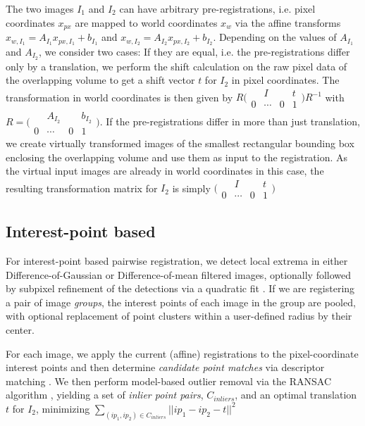 The two images $I_1$ and $I_2$ can have arbitrary pre-registrations, i.e. pixel coordinates $x_{px}$ are mapped to world coordinates $x_w$ via the affine transforms $x_{w,I_1} = A _{I_1}x_{px,I_1} + b_{I_1}$ and $x_{w,I_2} = A _{I_2}x_{px,I_2} + b_{I_2}$. Depending on the values of $ A _{I_1}$ and $ A _{I_2}$, we consider two cases: If they are equal, i.e. the pre-registrations differ only by a translation, we perform the shift calculation on the raw pixel data of the overlapping volume to get a shift vector $t$ for $I_2$ in pixel coordinates. The transformation in world coordinates is then given by $R \bigl(\begin{smallmatrix}  & I & & t \\  0 & \cdots & 0 & 1 \end{smallmatrix}\bigr) R^{-1} $ with $R = \bigl(\begin{smallmatrix}  & A_{I_2} & & b_{I_2} \\  0 & \cdots & 0 & 1 \end{smallmatrix}\bigr)$. If the pre-registrations differ in more than just translation, we create virtually transformed images of the smallest rectangular bounding box enclosing the overlapping volume and use them as input to the registration. As the virtual input images are already in world coordinates in this case, the resulting transformation matrix for $I_2$ is simply $\bigl(\begin{smallmatrix}  & I & & t \\  0 & \cdots & 0 & 1 \end{smallmatrix}\bigr)$

\subsection*{Interest-point based}
\label{sssec:ip-registration}

For interest-point based pairwise registration, we detect local extrema in either Difference-of-Gaussian or Difference-of-mean filtered images, optionally followed by subpixel refinement of the detections via a quadratic fit \cite{lowe2004distinctive}. If we are registering a pair of image \emph{groups}, the interest points of each image in the group are pooled, with optional replacement of point clusters within a user-defined radius by their center.

For each image, we apply the current (affine) registrations to the pixel-coordinate interest points and then determine \emph{candidate point matches} via descriptor matching \cite{beads, descriptor}. We then perform model-based outlier removal via the RANSAC algorithm \cite{ransac}, yielding a set of \emph{inlier point pairs}, $C_{inliers}$, and an optimal translation $t$ for $I_2$, minimizing $\sum_{(ip_1, ip_2) \in C_{inliers} }{|| ip_1 - ip_2 - t||^2}$

